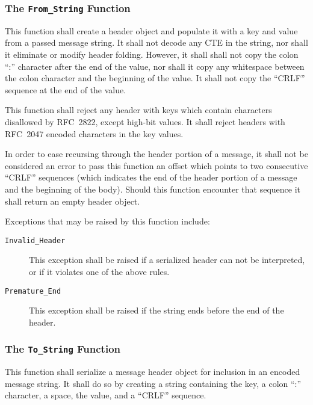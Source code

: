 \documentclass[11pt]{article}
\begin{document}
\subsubsection{The \texttt{From\_String} Function}

This function shall create a header object and populate it with a key
and value from a passed message string. It shall not decode any CTE in
the string, nor shall it eliminate or modify header folding. However,
it shall shall not copy the colon ``:'' character after the end of the
value, nor shall it copy any whitespace between the colon character
and the beginning of the value. It shall not copy the ``CRLF''
sequence at the end of the value.

This function shall reject any header with keys which contain
characters disallowed by RFC~2822, except high-bit values. It shall
reject headers with RFC~2047 encoded characters in the key values. 

In order to ease recursing through the header portion of a message, it
shall not be considered an error to pass this function an offset
which points to two consecutive ``CRLF'' sequences (which indicates
the end of the header portion of a message and the beginning of the
body). Should this function encounter that sequence it shall return an
empty header object.

Exceptions that may be raised by this function include: 

\begin{description}

\item[\texttt{Invalid\_Header}] This exception shall be raised if a
  serialized header can not be interpreted, or if it violates one of
  the above rules.

\item[\texttt{Premature\_End}] This exception shall be raised if the
  string ends before the end of the header.

\end{description}

\subsubsection{The \texttt{To\_String} Function}
\label{sr:headers:to-message-string}

This function shall serialize a message header object for inclusion in
an encoded message string. It shall do so by creating a string
containing the key, a colon ``:'' character, a space, the value, and a
``CRLF'' sequence. 
\end{document}
